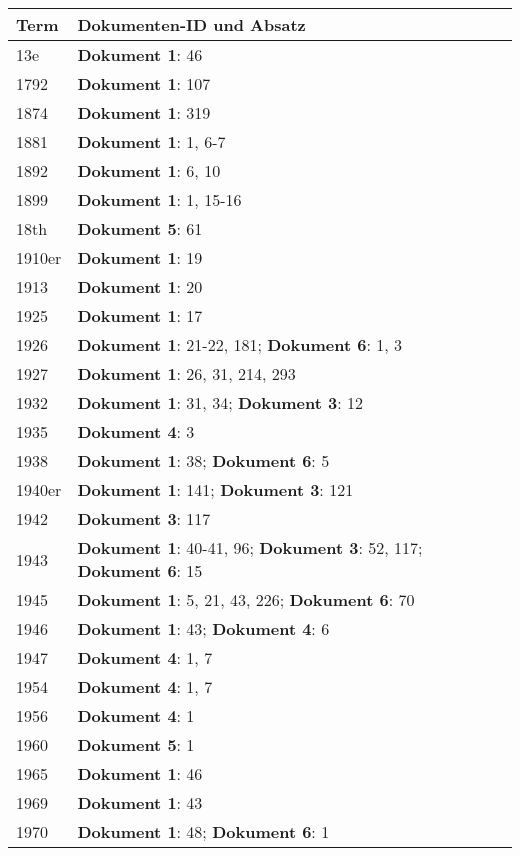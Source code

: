 \documentclass[a5paper]{article}
\begin{document}
\begin{longtable}[l]{|l|p{3in}|}
\hline
\textbf{Term} & \textbf{Dokumenten-ID und Absatz} \\
\hline
\endfirsthead
13e & \textbf{Dokument 1}: 46 \\
\hline
1792 & \textbf{Dokument 1}: 107 \\
\hline
1874 & \textbf{Dokument 1}: 319 \\
\hline
1881 & \textbf{Dokument 1}: 1, 6-7 \\
\hline
1892 & \textbf{Dokument 1}: 6, 10 \\
\hline
1899 & \textbf{Dokument 1}: 1, 15-16 \\
\hline
18th & \textbf{Dokument 5}: 61 \\
\hline
1910er & \textbf{Dokument 1}: 19 \\
\hline
1913 & \textbf{Dokument 1}: 20 \\
\hline
1925 & \textbf{Dokument 1}: 17 \\
\hline
1926 & \textbf{Dokument 1}: 21-22, 181; \textbf{Dokument 6}: 1, 3 \\
\hline
1927 & \textbf{Dokument 1}: 26, 31, 214, 293 \\
\hline
1932 & \textbf{Dokument 1}: 31, 34; \textbf{Dokument 3}: 12 \\
\hline
1935 & \textbf{Dokument 4}: 3 \\
\hline
1938 & \textbf{Dokument 1}: 38; \textbf{Dokument 6}: 5 \\
\hline
1940er & \textbf{Dokument 1}: 141; \textbf{Dokument 3}: 121 \\
\hline
1942 & \textbf{Dokument 3}: 117 \\
\hline
1943 & \textbf{Dokument 1}: 40-41, 96; \textbf{Dokument 3}: 52, 117; \textbf{Dokument 6}: 15 \\
\hline
1945 & \textbf{Dokument 1}: 5, 21, 43, 226; \textbf{Dokument 6}: 70 \\
\hline
1946 & \textbf{Dokument 1}: 43; \textbf{Dokument 4}: 6 \\
\hline
1947 & \textbf{Dokument 4}: 1, 7 \\
\hline
1954 & \textbf{Dokument 4}: 1, 7 \\
\hline
1956 & \textbf{Dokument 4}: 1 \\
\hline
1960 & \textbf{Dokument 5}: 1 \\
\hline
1965 & \textbf{Dokument 1}: 46 \\
\hline
1969 & \textbf{Dokument 1}: 43 \\
\hline
1970 & \textbf{Dokument 1}: 48; \textbf{Dokument 6}: 1 \\

\end{longtable}
\end{document}
